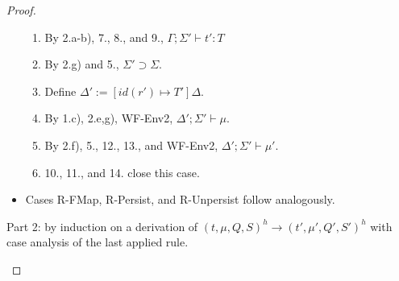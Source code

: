 \documentclass{article}
\theoremstyle{definition}
\begin{document}
\begin{proof}
\begin{itemize}
\begin{enumerate}
\item By 2.a-b), 7., 8., and 9., $\Gamma ; \Sigma' \vdash t' : T$
\item By 2.g) and 5., $\Sigma' \supset \Sigma$.
\item Define $\Delta' := [id(r') \mapsto T']\Delta$.
\item By 1.c), 2.e,g), WF-Env2, $\Delta' ; \Sigma' \vdash \mu$.
\item By 2.f), 5., 12., 13., and WF-Env2, $\Delta' ; \Sigma' \vdash \mu'$.
\item 10., 11., and 14. close this case.
\end{enumerate}

\item Cases R-FMap, R-Persist, and R-Unpersist follow analogously.
\end{itemize}

Part 2: by induction on a derivation of $(t, \mu, Q, S)^h \longrightarrow (t', \mu', Q', S')^h$ with case analysis of the last applied rule.

\begin{itemize}


\end{itemize}
\end{proof}
\end{document}
